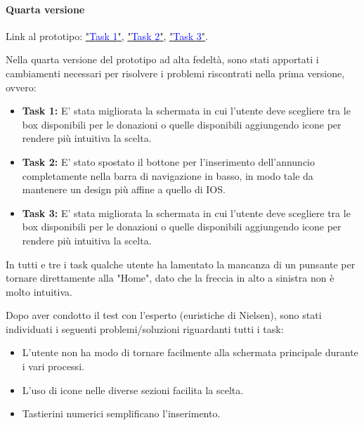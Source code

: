 \documentclass{article}
\begin{document}
\paragraph{Quarta versione}
\mbox{}
\newline
Link al prototipo: \href{https://www.figma.com/proto/xET26iTanAxBERu0jhT0FS/Task?node-id=138-3439&t=B2AQnp2Nm302p0AJ-1}{"\textcolor{blue}{Task 1}"}, \href{https://www.figma.com/proto/xET26iTanAxBERu0jhT0FS/Task?node-id=211-2854&t=B2AQnp2Nm302p0AJ-1}{"\textcolor{blue}{Task 2}"}, \href{https://www.figma.com/proto/xET26iTanAxBERu0jhT0FS/Task?node-id=168-2851&t=B2AQnp2Nm302p0AJ-1}{"\textcolor{blue}{Task 3}"}.

Nella quarta versione del prototipo ad alta fedeltà, sono stati apportati i cambiamenti necessari per risolvere i problemi riscontrati nella prima versione, ovvero:
\begin{itemize}
    \item \textbf{Task 1:} E' stata migliorata la schermata in cui l'utente deve scegliere tra le box disponibili per le donazioni o quelle disponibili aggiungendo icone per rendere più intuitiva la scelta.
    \item \textbf{Task 2:} E' stato spostato il bottone per l'inserimento dell'annuncio completamente nella barra di navigazione in basso, in modo tale da mantenere un design più affine a quello di IOS.
    \item \textbf{Task 3:} E' stata migliorata la schermata in cui l'utente deve scegliere tra le box disponibili per le donazioni o quelle disponibili aggiungendo icone per rendere più intuitiva la scelta.
\end{itemize}

In tutti e tre i task qualche utente ha lamentato la mancanza di un punsante per tornare direttamente alla "Home", dato che la freccia in alto a sinistra non è molto intuitiva.

Dopo aver condotto il test con l'esperto (euristiche di Nielsen), sono stati individuati i seguenti problemi/soluzioni riguardanti tutti i task:
\begin{itemize}
    \item L’utente non ha modo di tornare facilmente alla schermata principale durante i vari processi.
    \item L’uso di icone nelle diverse sezioni facilita la scelta.  
    \item Tastierini numerici semplificano l’inserimento.
\end{itemize}
\end{document}
